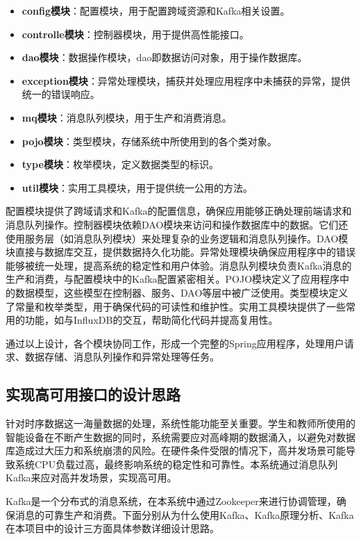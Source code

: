 \documentclass[oneside]{xduugthesis}
\begin{document}
\begin{itemize}[nosep]
    \item \textbf{config模块}：配置模块，用于配置跨域资源和Kafka相关设置。
    \item \textbf{controlle模块}：控制器模块，用于提供高性能接口。
    \item \textbf{dao模块}：数据操作模块，dao即数据访问对象，用于操作数据库。
    \item \textbf{exception模块}：异常处理模块，捕获并处理应用程序中未捕获的异常，提供统一的错误响应。
    \item \textbf{mq模块}：消息队列模块，用于生产和消费消息。
    \item \textbf{pojo模块}：类型模块，存储系统中所使用到的各个类对象。
    \item \textbf{type模块}：枚举模块，定义数据类型的标识。
    \item \textbf{util模块}：实用工具模块，用于提供统一公用的方法。
\end{itemize}

配置模块提供了跨域请求和Kafka的配置信息，确保应用能够正确处理前端请求和消息队列操作。控制器模块依赖DAO模块来访问和操作数据库中的数据。它们还使用服务层（如消息队列模块）来处理复杂的业务逻辑和消息队列操作。DAO模块直接与数据库交互，提供数据持久化功能。异常处理模块确保应用程序中的错误能够被统一处理，提高系统的稳定性和用户体验。消息队列模块负责Kafka消息的生产和消费，与配置模块中的Kafka配置紧密相关。POJO模块定义了应用程序中的数据模型，这些模型在控制器、服务、DAO等层中被广泛使用。类型模块定义了常量和枚举类型，用于确保代码的可读性和维护性。实用工具模块提供了一些常用的功能，如与InfluxDB的交互，帮助简化代码并提高复用性。

通过以上设计，各个模块协同工作，形成一个完整的Spring应用程序，处理用户请求、数据存储、消息队列操作和异常处理等任务。

\subsection{实现高可用接口的设计思路}

针对时序数据这一海量数据的处理，系统性能功能至关重要。学生和教师所使用的智能设备在不断产生数据的同时，系统需要应对高峰期的数据涌入，以避免对数据库造成过大压力和系统崩溃的风险。在硬件条件受限的情况下，高并发场景可能导致系统CPU负载过高，最终影响系统的稳定性和可靠性。本系统通过消息队列Kafka来应对高并发场景，实现高可用。

Kafka是一个分布式的消息系统，在本系统中通过Zookeeper来进行协调管理，确保消息的可靠生产和消费。下面分别从为什么使用Kafka、Kafka原理分析、Kafka在本项目中的设计三方面具体参数详细设计思路。
\end{document}
